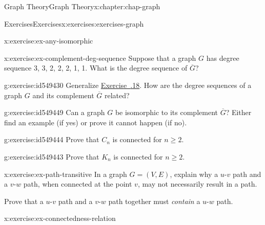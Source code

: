 \documentclass[oneside,10pt,]{book}
\newcommand{\xreffont}{\relax}
\numberwithin{equation}{section}
\begin{document}
\begin{chapterptx}{Graph Theory}{}{Graph Theory}{}{}{x:chapter:chap-graph}
\begin{exercises-section}{Exercises}{}{Exercises}{}{}{x:exercises:exercises-graph}
\begin{divisionexercise}{17}{}{}{x:exercise:ex-any-isomorphic}
\begin{sidebyside}{4}{0.015}{0.015}{0.03}
\begin{sbspanel}{0.22}
{
}%
\end{sbspanel}%
\end{sidebyside}%
\end{divisionexercise}%
\begin{divisionexercise}{18}{}{}{x:exercise:ex-complement-deg-sequence}%
Suppose that a graph \(G\) has degree sequence 3, 3, 2, 2, 2, 1, 1. What is the degree sequence of \(\overline{G}\)?%
\end{divisionexercise}%
\begin{divisionexercise}{19}{}{}{g:exercise:id549430}%
Generalize \hyperlink{x:exercise:ex-complement-deg-sequence}{Exercise~{\xreffont 5.8.18}}. How are the degree sequences of a graph \(G\) and its complement \(\overline{G}\) related?%
\end{divisionexercise}%
\begin{divisionexercise}{20}{}{}{g:exercise:id549449}%
Can a graph \(G\) be isomorphic to its complement \(\overline{G}\)? Either find an example (if yes) or prove it cannot happen (if no).%
\end{divisionexercise}%
\begin{divisionexercise}{21}{}{}{g:exercise:id549444}%
Prove that \(C_n\) is connected for \(n \geq 2\).%
\end{divisionexercise}%
\begin{divisionexercise}{22}{}{}{g:exercise:id549443}%
Prove that \(K_n\) is connected for \(n \geq 2\).%
\end{divisionexercise}%
\begin{divisionexercise}{23}{}{}{x:exercise:ex-path-transitive}%
In a graph \(G = (V,E)\), explain why a \(u\)-\(v\) path and a \(v\)-\(w\) path, when connected at the point \(v\), may not necessarily result in a path.%
\par
Prove that a \(u\)-\(v\) path and a \(v\)-\(w\) path together must \emph{contain} a \(u\)-\(w\) path.%
\end{divisionexercise}%
\begin{divisionexercise}{24}{}{}{x:exercise:ex-connectedness-relation}%

\end{divisionexercise}
\end{exercises-section}
\end{chapterptx}
\end{document}
